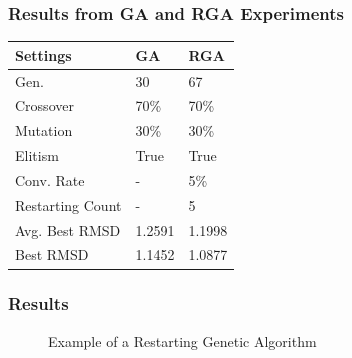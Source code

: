 \documentclass[10pt]{beamer}
\begin{document}
\begin{frame}
	\frametitle{Results from GA and RGA Experiments}

	\begin{table}
	  \begin{tabular}{ | l | l | l |}
	    \hline
	    Settings & GA & RGA \\ \hline \hline
	    Gen. & 30 & 67 \\ \hline
	    Crossover & 70\% & 70\% \\ \hline
	    Mutation & 30\% & 30\% \\ \hline
	    Elitism & True & True \\ \hline
	    Conv. Rate & - & 5\% \\ \hline
	    Restarting Count & - & 5 \\ \hline
	    Avg. Best RMSD & 1.2591 & 1.1998 \\ \hline
	    Best RMSD & 1.1452 & 1.0877 \\ \hline
	  \end{tabular}
	\end{table}

\end{frame}

\begin{frame}
	\frametitle{Results}

	\begin{figure}
		\caption{Example of a Restarting Genetic Algorithm}
	\end{figure}

\end{frame}
\end{document}
